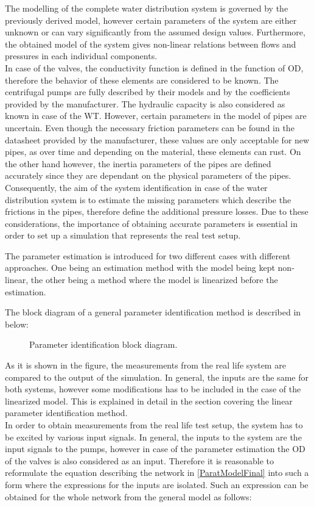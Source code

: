 The modelling of the complete water distribution system is governed by the previously derived model, however certain parameters of the system are either unknown or can vary significantly from the assumed design values. Furthermore, the obtained model of the system gives non-linear relations between flows and pressures in each individual components. 
\\
In case of the valves, the conductivity function is defined in the function of OD, therefore the behavior of these elements are considered to be known. The centrifugal pumps are fully described by their models and by the coefficients provided by the manufacturer. The hydraulic capacity is also considered as known in case of the WT. However, certain parameters in the model of pipes are uncertain. Even though the necessary friction parameters can be found in the datasheet provided by the manufacturer, these values are only acceptable for new pipes, as over time and depending on the material, these elements can rust. On the other hand however, the inertia parameters of the pipes are defined accurately since they are dependant on the physical parameters of the pipes. 
\\
Consequently, the aim of the system identification in case of the water distribution system is to estimate the missing parameters which describe the frictions in the pipes, therefore define the additional pressure losses. Due to these considerations, the importance of obtaining accurate parameters is essential in order to set up a simulation that represents the real test setup. 

The parameter estimation is introduced for two different cases with different approaches. One being an estimation method with the model being kept non-linear, the other being a method where the model is  linearized before the estimation. 

The block diagram of a general parameter identification method is described in  below: 

\begin{figure}[H]
\centering
 
\caption{Parameter identification block diagram. }
\label{fig:parame_block}
\end{figure}

As it is shown in the figure, the measurements from the real life system are compared to the output of the simulation. In general, the inputs are the same for both systems, however some modifications has to be included in the case of the linearized model. This is explained in detail in the section covering the linear parameter identification method.
\\
In order to obtain measurements from the real life test setup, the system has to be excited by various input signals. In general, the inputs to the system are the input signals to the pumps, however in case of the parameter estimation the OD of the valves is also considered as an input. Therefore it is reasonable to reformulate the equation describing the network in \eqref{ParatModelFinal} into such a form where the expressions for the inputs are isolated. Such an expression can be obtained for the whole network from the general model as follows: 

